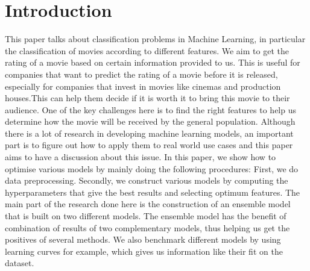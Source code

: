 \chapter{Introduction}
This paper talks about classification problems in Machine Learning, in particular the classification of movies according to different features. We aim to get the rating of a movie based on certain information provided to us. This is useful for companies that want to predict the rating of a movie before it is released, especially for companies that invest in movies like cinemas and production houses.This can help them decide if it is worth it to bring this movie to their audience.
One of the key challenges here is to find the right features to help us determine how the movie will be received by the general population. Although there is a lot of research in developing machine learning models, an important part is to figure out how to apply them to real world use cases and this paper aims to have a discussion about this issue.
In this paper, we show how to optimise various models by mainly doing the following procedures: First, we do data preprocessing. Secondly, we construct various models by computing the hyperparameters that give the best results and selecting optimum features. The main part of the research done here is the construction of an ensemble model that is built on two different models. The ensemble model has the benefit of combination of results of two complementary models, thus helping us get the positives of several methods. We also benchmark different models by using learning curves for example, which gives us information like their fit on the dataset.
